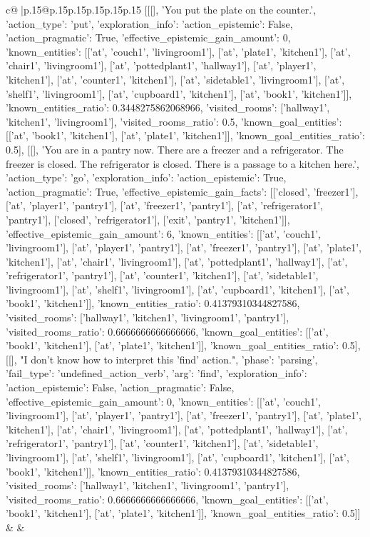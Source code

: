 \documentclass{article}
\begin{document}
{\begin{supertabular}{c@{$\;$}|p{.15\linewidth}@{}p{.15\linewidth}p{.15\linewidth}p{.15\linewidth}p{.15\linewidth}p{.15\linewidth}}
{{{	 [[[], 'You put the plate on the counter.', {'action_type': 'put', 'exploration_info': {'action_epistemic': False, 'action_pragmatic': True, 'effective_epistemic_gain_amount': 0, 'known_entities': [['at', 'couch1', 'livingroom1'], ['at', 'plate1', 'kitchen1'], ['at', 'chair1', 'livingroom1'], ['at', 'pottedplant1', 'hallway1'], ['at', 'player1', 'kitchen1'], ['at', 'counter1', 'kitchen1'], ['at', 'sidetable1', 'livingroom1'], ['at', 'shelf1', 'livingroom1'], ['at', 'cupboard1', 'kitchen1'], ['at', 'book1', 'kitchen1']], 'known_entities_ratio': 0.3448275862068966, 'visited_rooms': ['hallway1', 'kitchen1', 'livingroom1'], 'visited_rooms_ratio': 0.5, 'known_goal_entities': [['at', 'book1', 'kitchen1'], ['at', 'plate1', 'kitchen1']], 'known_goal_entities_ratio': 0.5}}], [[], 'You are in a pantry now. There are a freezer and a refrigerator. The freezer is closed. The refrigerator is closed. There is a passage to a kitchen here.', {'action_type': 'go', 'exploration_info': {'action_epistemic': True, 'action_pragmatic': True, 'effective_epistemic_gain_facts': [['closed', 'freezer1'], ['at', 'player1', 'pantry1'], ['at', 'freezer1', 'pantry1'], ['at', 'refrigerator1', 'pantry1'], ['closed', 'refrigerator1'], ['exit', 'pantry1', 'kitchen1']], 'effective_epistemic_gain_amount': 6, 'known_entities': [['at', 'couch1', 'livingroom1'], ['at', 'player1', 'pantry1'], ['at', 'freezer1', 'pantry1'], ['at', 'plate1', 'kitchen1'], ['at', 'chair1', 'livingroom1'], ['at', 'pottedplant1', 'hallway1'], ['at', 'refrigerator1', 'pantry1'], ['at', 'counter1', 'kitchen1'], ['at', 'sidetable1', 'livingroom1'], ['at', 'shelf1', 'livingroom1'], ['at', 'cupboard1', 'kitchen1'], ['at', 'book1', 'kitchen1']], 'known_entities_ratio': 0.41379310344827586, 'visited_rooms': ['hallway1', 'kitchen1', 'livingroom1', 'pantry1'], 'visited_rooms_ratio': 0.6666666666666666, 'known_goal_entities': [['at', 'book1', 'kitchen1'], ['at', 'plate1', 'kitchen1']], 'known_goal_entities_ratio': 0.5}}], [[], "I don't know how to interpret this 'find' action.", {'phase': 'parsing', 'fail_type': 'undefined_action_verb', 'arg': 'find', 'exploration_info': {'action_epistemic': False, 'action_pragmatic': False, 'effective_epistemic_gain_amount': 0, 'known_entities': [['at', 'couch1', 'livingroom1'], ['at', 'player1', 'pantry1'], ['at', 'freezer1', 'pantry1'], ['at', 'plate1', 'kitchen1'], ['at', 'chair1', 'livingroom1'], ['at', 'pottedplant1', 'hallway1'], ['at', 'refrigerator1', 'pantry1'], ['at', 'counter1', 'kitchen1'], ['at', 'sidetable1', 'livingroom1'], ['at', 'shelf1', 'livingroom1'], ['at', 'cupboard1', 'kitchen1'], ['at', 'book1', 'kitchen1']], 'known_entities_ratio': 0.41379310344827586, 'visited_rooms': ['hallway1', 'kitchen1', 'livingroom1', 'pantry1'], 'visited_rooms_ratio': 0.6666666666666666, 'known_goal_entities': [['at', 'book1', 'kitchen1'], ['at', 'plate1', 'kitchen1']], 'known_goal_entities_ratio': 0.5}}]] 
	  } 
	   } 
	   } 
	 & & \\ 
 


\end{supertabular}}
\end{document}
